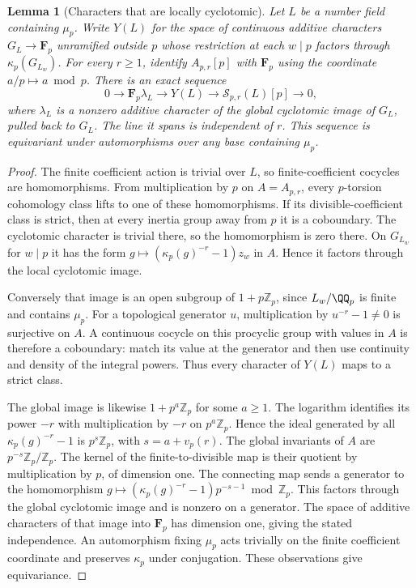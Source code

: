 \documentclass[a4paper,11pt]{article}
\newtheorem{lemma}[proposition]{Lemma}
\theoremstyle{definition}
\theoremstyle{remark}
\newcommand{\ZZ}{\mathbb Z}\newcommand{\ord}{\operatorname{ord}}
\numberwithin{equation}{section}
\newcommand{\Sel}{\mathcal S}
\begin{document}
\begin{lemma}[Characters that are locally cyclotomic]\label{lem:local27}
Let \(L\) be a number field containing \(\mu_p\). Write \(Y(L)\) for the space of continuous additive characters \(G_L\to\mathbf F_p\) unramified outside \(p\) whose restriction at each \(w\mid p\) factors through \(\kappa_p(G_{L_w})\). For every \(r\ge1\), identify \(A_{p,r}[p]\) with \(\mathbf F_p\) using the coordinate \(a/p\mapsto a\bmod p\). There is an exact sequence
\begin{equation}
 0\longrightarrow \mathbf F_p\lambda_L\longrightarrow Y(L)
      \longrightarrow\Sel_{p,r}(L)[p]\longrightarrow0,        \label{eq:line27}
\end{equation}
where \(\lambda_L\) is a nonzero additive character of the global cyclotomic image of \(G_L\), pulled back to \(G_L\). The line it spans is independent of \(r\). This sequence is equivariant under automorphisms over any base containing \(\mu_p\).
\end{lemma}
\begin{proof}
The finite coefficient action is trivial over \(L\), so finite-coefficient cocycles are homomorphisms. From multiplication by \(p\) on \(A=A_{p,r}\), every \(p\)-torsion cohomology class lifts to one of these homomorphisms. If its divisible-coefficient class is strict, then at every inertia group away from \(p\) it is a coboundary. The cyclotomic character is trivial there, so the homomorphism is zero there. On \(G_{L_w}\) for \(w\mid p\) it has the form \(g\mapsto(\kappa_p(g)^{-r}-1)z_w\) in \(A\). Hence it factors through the local cyclotomic image.

Conversely that image is an open subgroup of \(1+p\ZZ_p\), since \(L_w/\QQ_p\) is finite and contains \(\mu_p\). For a topological generator \(u\), multiplication by \(u^{-r}-1\ne0\) is surjective on \(A\). A continuous cocycle on this procyclic group with values in \(A\) is therefore a coboundary: match its value at the generator and then use continuity and density of the integral powers. Thus every character of \(Y(L)\) maps to a strict class.

The global image is likewise \(1+p^a\ZZ_p\) for some \(a\ge1\). The logarithm identifies its power \(-r\) with multiplication by \(-r\) on \(p^a\ZZ_p\). Hence the ideal generated by all \(\kappa_p(g)^{-r}-1\) is \(p^s\ZZ_p\), with \(s=a+v_p(r)\). The global invariants of \(A\) are \(p^{-s}\ZZ_p/\ZZ_p\). The kernel of the finite-to-divisible map is their quotient by multiplication by \(p\), of dimension one. The connecting map sends a generator to the homomorphism \(g\mapsto(\kappa_p(g)^{-r}-1)p^{-s-1}\bmod\ZZ_p\). This factors through the global cyclotomic image and is nonzero on a generator. The space of additive characters of that image into \(\mathbf F_p\) has dimension one, giving the stated independence. An automorphism fixing \(\mu_p\) acts trivially on the finite coefficient coordinate and preserves \(\kappa_p\) under conjugation. These observations give equivariance.
\end{proof}
\end{document}
